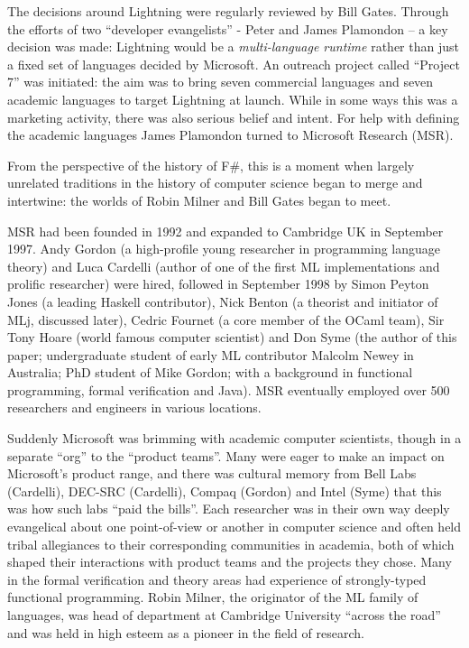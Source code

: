 \documentclass[acmsmall,review]{acmart}\settopmatter{printfolios=true,printccs=false,printacmref=false}
\begin{document}
The decisions around Lightning were regularly reviewed by Bill Gates. Through the efforts of two “developer evangelists” - Peter and James Plamondon  – a key decision was made: Lightning would be a \emph{multi-language runtime} rather than just a fixed set of languages decided by Microsoft.  An outreach project called “Project 7” was initiated: the aim was to bring seven commercial languages and seven academic languages to target Lightning at launch. While in some ways this was a marketing activity, there was also serious belief and intent.  For help with defining the academic languages James Plamondon turned to Microsoft Research (MSR).

From the perspective of the history of F\#, this is a moment when largely unrelated traditions in the history of computer science began to merge and intertwine: the worlds of Robin Milner and Bill Gates began to meet.

MSR had been founded in 1992 and expanded to Cambridge UK in September 1997. Andy Gordon (a high-profile young researcher in programming language theory) and Luca Cardelli (author of one of the first ML implementations and prolific researcher) were hired, followed in September 1998 by Simon Peyton Jones (a leading Haskell contributor), Nick Benton (a theorist and initiator of MLj, discussed later), Cedric Fournet (a core member of the OCaml team), Sir Tony Hoare (world famous computer scientist) and Don Syme (the author of this paper; undergraduate student of early ML contributor Malcolm Newey in Australia; PhD student of Mike Gordon; with a background in functional programming, formal verification and Java). MSR eventually employed over 500 researchers and engineers in various locations.  

Suddenly Microsoft was brimming with academic computer scientists, though in a separate “org” to the “product teams”.  Many were eager to make an impact on Microsoft’s product range, and there was cultural memory from Bell Labs (Cardelli), DEC-SRC (Cardelli), Compaq (Gordon) and Intel (Syme) that this was how such labs “paid the bills”.  Each researcher was in their own way deeply evangelical about one point-of-view or another in computer science and often held tribal allegiances to their corresponding communities in academia, both of which shaped their interactions with product teams and the projects they chose. Many in the formal verification and theory areas had experience of strongly-typed functional programming. Robin Milner, the originator of the ML family of languages, was head of department at Cambridge University “across the road” and was held in high esteem as a pioneer in the field of research. 
\end{document}
